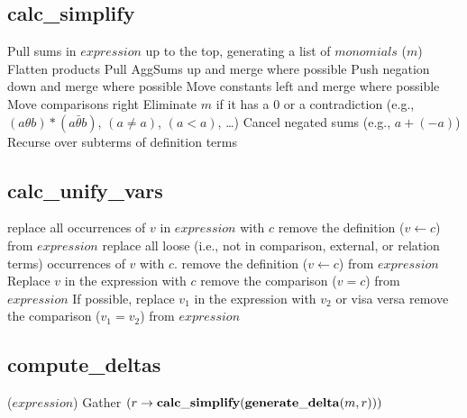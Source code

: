 \documentclass[11pt]{amsart}
\begin{document}
\subsection{calc\_simplify}
\begin{algorithmic}
\STATE Pull sums in $expression$ up to the top, generating a list of $monomials$
  \REPEAT
    ($m$)
    \STATE Flatten products
    \STATE Pull AggSums up and merge where possible
    \STATE Push negation down and merge where possible
    \STATE Move constants left and merge where possible
    \STATE Move comparisons right
    \STATE Eliminate $m$ if it has a 0 or a contradiction (e.g., $(a \theta b) * (a \bar \theta b)$, $(a \neq a)$, $(a < a)$, \ldots)
    \STATE {}
  \STATE Cancel negated sums (e.g., $a + (- a)$)
  \STATE Recurse over subterms of definition terms
\ENDFOR
\STATE 
\end{algorithmic}

\subsection{calc\_unify\_vars}
\begin{algorithmic}
    \STATE replace all occurrences of $v$ in $expression$ with $c$
    \STATE remove the definition ($v \leftarrow c$) from $expression$
  \ENDIF
  \STATE replace all loose (i.e., not in comparison, external, or relation terms) occurrences of $v$ with $c$.
    \STATE remove the definition ($v \leftarrow c$) from $expression$
  \ENDIF
\ENDFOR
{}
  \STATE Replace $v$ in the expression with $c$
  \STATE remove the comparison ($v = c$) from $expression$
\ENDFOR
{}
  \STATE If possible, replace $v_1$ in the expression with $v_2$ or visa versa
  \STATE remove the comparison ($v_1 = v_2$) from $expression$
\ENDFOR
\end{algorithmic}

\subsection{compute\_deltas}
\begin{algorithmic}
($expression$)
    \STATE Gather $(r \rightarrow {\bf calc\_simplify}({\bf generate\_delta}(m, r)))$
  \ENDFOR
\ENDFOR
\end{algorithmic}
\end{document}
